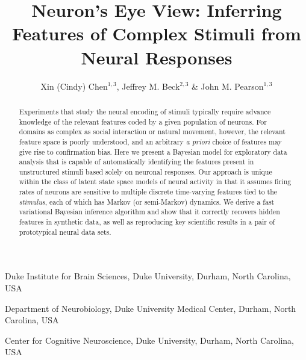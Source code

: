 \documentclass{nature}
\title{Neuron's Eye View: Inferring Features of Complex Stimuli from Neural Responses}
\author{Xin (Cindy) Chen$^{1,3}$, Jeffrey M. Beck$^{2, 3}$ \& John M. Pearson$^{1, 3}$}
\begin{document}
\maketitle

\begin{affiliations}
 \item Duke Institute for Brain Sciences, Duke University, Durham, North Carolina, USA
 \item Department of Neurobiology, Duke University Medical Center, Durham, North Carolina, USA
 \item Center for Cognitive Neuroscience, Duke University, Durham, North Carolina, USA
\end{affiliations}

\begin{abstract}

Experiments that study the neural encoding of stimuli typically require advance knowledge of the relevant features coded by a given population of neurons. For domains as complex as social interaction or natural movement, however, the relevant feature space is poorly understood, and an arbitrary \emph{a priori} choice of features may give rise to confirmation bias. Here we present a Bayesian model for exploratory data analysis that is capable of automatically identifying the features present in unstructured stimuli based solely on neuronal responses. Our approach is unique within the class of latent state space models of neural activity in that it assumes firing rates of neurons are sensitive to multiple discrete time-varying features tied to the \emph{stimulus}, each of which has Markov (or semi-Markov) dynamics. We derive a fast variational Bayesian inference algorithm and show that it correctly recovers hidden features in synthetic data, as well as reproducing key scientific results in a pair of prototypical neural data sets.

\end{abstract}

\end{document}

